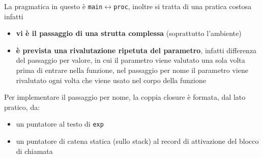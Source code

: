 La pragmatica in questo è \texttt{main$\leftrightarrow$proc}, inoltre si tratta di una pratica costosa infatti

\begin{itemize}
    \item \textbf{vi è il passaggio di una strutta complessa} (soprattutto l'ambiente)
    \item \textbf{è prevista una rivalutazione ripetuta del parametro}, infatti differenza del passaggio per valore, in cui il parametro viene valutato una sola volta prima di entrare nella funzione, nel passaggio per nome il parametro viene rivalutato ogni volta che viene usato nel corpo della funzione
\end{itemize}

Per implementare il passaggio per nome, la coppia closure è formata, dal lato pratico, da:
\begin{itemize}
    \item un puntatore al testo di \texttt{exp}
    \item un puntatore di catena statica (sullo stack) al record di attivazione del blocco di chiamata
\end{itemize}
